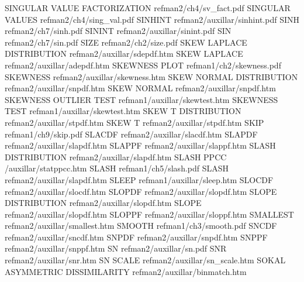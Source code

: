 SINGULAR VALUE FACTORIZATION            refman2/ch4/sv_fact.pdf
SINGULAR VALUES                         refman2/ch4/sing_val.pdf
SINHINT                                 refman2/auxillar/sinhint.pdf
SINH                                    refman2/ch7/sinh.pdf
SININT                                  refman2/auxillar/sinint.pdf
SIN                                     refman2/ch7/sin.pdf
SIZE                                    refman2/ch2/size.pdf
SKEW LAPLACE DISTRIBUTION               refman2/auxillar/sdepdf.htm
SKEW LAPLACE                            refman2/auxillar/adepdf.htm
SKEWNESS PLOT                           refman1/ch2/skewness.pdf
SKEWNESS                                refman2/auxillar/skewness.htm
SKEW NORMAL DISTRIBUTION                refman2/auxillar/snpdf.htm
SKEW NORMAL                             refman2/auxillar/snpdf.htm
SKEWNESS OUTLIER TEST                   refman1/auxillar/skewtest.htm
SKEWNESS TEST                           refman1/auxillar/skewtest.htm
SKEW T DISTRIBUTION                     refman2/auxillar/stpdf.htm
SKEW T                                  refman2/auxillar/stpdf.htm
SKIP                                    refman1/ch9/skip.pdf
SLACDF                                  refman2/auxillar/slacdf.htm
SLAPDF                                  refman2/auxillar/slapdf.htm
SLAPPF                                  refman2/auxillar/slappf.htm
SLASH DISTRIBUTION                      refman2/auxillar/slapdf.htm
SLASH PPCC                              /auxillar/statppcc.htm
SLASH                                   refman1/ch5/slash.pdf
SLASH                                   refman2/auxillar/slapdf.htm
SLEEP                                   refman1/auxillar/sleep.htm
SLOCDF                                  refman2/auxillar/slocdf.htm
SLOPDF                                  refman2/auxillar/slopdf.htm
SLOPE DISTRIBUTION                      refman2/auxillar/slopdf.htm
SLOPE                                   refman2/auxillar/slopdf.htm
SLOPPF                                  refman2/auxillar/sloppf.htm
SMALLEST                                refman2/auxillar/smallest.htm
SMOOTH                                  refman1/ch3/smooth.pdf
SNCDF                                   refman2/auxillar/sncdf.htm
SNPDF                                   refman2/auxillar/snpdf.htm
SNPPF                                   refman2/auxillar/snppf.htm
SN                                      refman2/auxillar/sn.pdf
SNR                                     refman2/auxillar/snr.htm
SN SCALE                                refman2/auxillar/sn_scale.htm
SOKAL ASYMMETRIC DISSIMILARITY          refman2/auxillar/binmatch.htm
